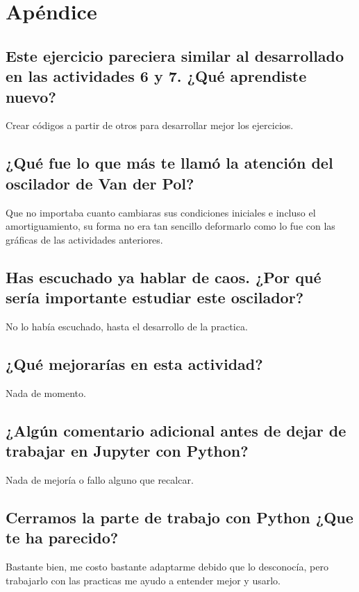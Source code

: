\documentclass{article}
\begin{document}
\section{Apéndice}
\subsection{Este ejercicio pareciera similar al desarrollado en las actividades 6 y 7. ¿Qué aprendiste nuevo?}
Crear códigos a partir de otros para desarrollar mejor los ejercicios.
\subsection{¿Qué fue lo que más te llamó la atención del oscilador de Van der Pol?}
Que no importaba cuanto cambiaras sus condiciones iniciales e incluso el amortiguamiento, su forma no era tan sencillo deformarlo como lo fue con las gráficas de las actividades anteriores.
\subsection{Has escuchado ya hablar de caos. ¿Por qué sería importante estudiar este oscilador?}
No lo había escuchado, hasta el desarrollo de la practica.
\subsection{¿Qué mejorarías en esta actividad?}
Nada de momento.
\subsection{¿Algún comentario adicional antes de dejar de trabajar en Jupyter con Python?}
Nada de mejoría o fallo alguno que recalcar.
\subsection{Cerramos la parte de trabajo con Python ¿Que te ha parecido?}
Bastante bien, me costo bastante adaptarme debido que lo desconocía, pero trabajarlo con las practicas me ayudo a entender mejor y usarlo.
\end{document}
